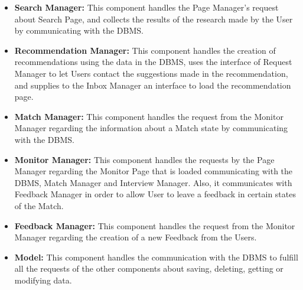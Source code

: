 \begin{itemize}
    \item \textbf{Search Manager:} This component handles the Page Manager's request about Search Page, and collects the results of the research made by the User by communicating with the DBMS.

    \item \textbf{Recommendation Manager:} This component handles the creation of recommendations using the data in the DBMS, uses the interface of Request Manager to let Users contact the suggestions made in the recommendation, and supplies to the Inbox Manager an interface to load the recommendation page.

    \item \textbf{Match Manager:} This component handles the request from the Monitor Manager regarding the information about a Match state by communicating with the DBMS.

    \item \textbf{Monitor Manager:} This component handles the requests by the Page Manager regarding the Monitor Page that is loaded communicating with the DBMS, Match Manager and Interview Manager. Also, it communicates with Feedback Manager in order to allow User to leave a feedback in certain states of the Match.

    \item \textbf{Feedback Manager:} This component handles the request from the Monitor Manager regarding the creation of a new Feedback from the Users.

    \item \textbf{Model:} This component handles the communication with the DBMS to fulfill all the requests of the other components about saving, deleting, getting or modifying data.
    
\end{itemize}
\pagebreak
